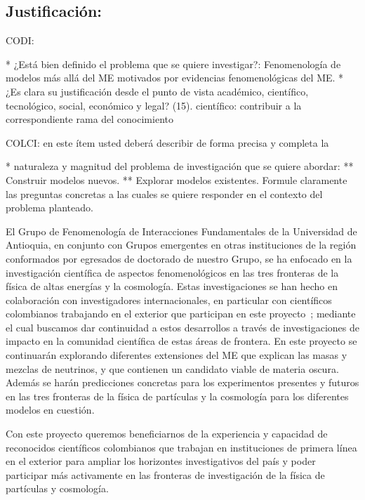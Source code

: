 \subsection{Justificación:                                 }
\begin{instrucciones}
  CODI: 

  * ¿Está bien definido el problema que se quiere investigar?:
  Fenomenología de modelos más allá del ME motivados por evidencias
  fenomenológicas del ME.  
  * ¿Es clara su justificación desde el punto de vista académico,
  científico, tecnológico, social, económico y legal? (15).
  científico: contribuir a la correspondiente rama del conocimiento

  COLCI: en este ítem usted deberá describir de forma precisa y completa la
  
  * naturaleza y magnitud del problema de investigación que se quiere
  abordar:
  ** Construir modelos nuevos.
  ** Explorar modelos existentes.
  Formule claramente las preguntas concretas a las cuales se
  quiere responder en el contexto del problema planteado.
\end{instrucciones}
El Grupo de Fenomenología de Interacciones Fundamentales de la
Universidad de Antioquia, en conjunto con Grupos emergentes en
otras instituciones de la región conformados por egresados de
doctorado de nuestro Grupo, se ha enfocado en la investigación
científica de aspectos fenomenológicos en las tres fronteras de la
física de altas energías y la cosmología. Estas investigaciones se han
hecho en colaboración con investigadores internacionales, en
particular con científicos colombianos trabajando en el exterior que
participan en este
proyecto~\cite{Sierra:2009zq,Sierra:2008wj,AristizabalSierra:2008ye,Choi:2010jt,AristizabalSierra:2009bh};
mediante el cual buscamos dar continuidad a estos desarrollos a través
de investigaciones de impacto en la comunidad científica de estas
áreas de frontera. En este proyecto se continuarán explorando
diferentes extensiones del ME que explican las masas y
mezclas de neutrinos, y que contienen un candidato viable de materia oscura.
Además se harán predicciones concretas para los experimentos presentes y futuros
en las tres fronteras de la física de partículas y la cosmología para los
diferentes modelos en cuestión.

Con este proyecto queremos beneficiarnos de la experiencia y capacidad
de reconocidos científicos colombianos que trabajan en instituciones
de primera línea en el exterior para ampliar los horizontes
investigativos del país y poder participar más activamente en las
fronteras de investigación de la física de partículas y cosmología.

